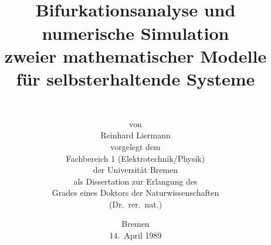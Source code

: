    \setlength{\textwidth}{14.9cm}
   \setlength{\oddsidemargin}{0.4cm}  %
   \setlength{\textheight}{21.6cm}
   \setlength{\topmargin}{+0.5cm}   %
%
%
%
 \title{ \rule[0.0ex]{0.0ex}{0.1ex}   \\
         [-10ex] Bifurkationsanalyse      und    \\
         numerische Simulation    \\
         zweier       mathematischer Modelle \\
         f\"ur      selbsterhaltende Systeme}
 \author{ \\ [-4ex] von \\ [4ex] Reinhard Liermann   \\
        [14ex] vorgelegt dem \\
              Fachbereich 1 (Elektrotechnik/Physik) \\
              der Universit\"at Bremen \\
              als Dissertation zur Erlangung des \\
              Grades eines Doktors der Naturwissenschaften \\
              (Dr.\ rer.\ nat.) \\
              [4ex]   }
\date{Bremen  \\    14.\  April  1989}
%
%

